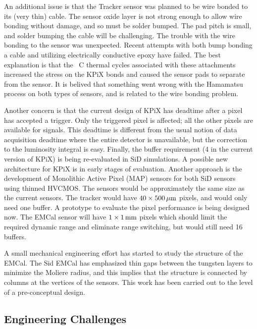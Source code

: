 An additional issue is that the Tracker sensor was planned to be wire bonded to its (very thin) cable. The sensor oxide layer is not strong enough to allow wire bonding without damage, and so must be solder bumped. The pad pitch is small, and solder bumping the cable will be challenging. The trouble with the wire bonding to the sensor was unexpected. Recent attempts with both bump bonding a cable and utilizing electrically conductive epoxy have failed. The best explanation is that the \unit[150]{\textdegree C} thermal cycles associated with these attachments increased the stress on the KPiX bonds and caused the sensor pads to separate from the sensor. It is belived that something went wrong with the Hamamatsu process on both types of sensors, and is related to the wire bonding problem.

Another concern is that the current design of KPiX has deadtime after a pixel has accepted a trigger. Only the triggered pixel is affected; all the other pixels are available for signals. This deadtime is different from the usual notion of data acquisition deadtime where the entire detector is unavailable, but the correction to the luminosity integral is easy. Finally, the buffer requirement (4 in the current version of KPiX) is being re-evaluated in SiD simulations. A possible new architecture for KPiX is in early stages of evaluation. Another approach is the development of Monolithic Active Pixel (MAP) sensors for both SiD sensors using thinned HVCMOS. The sensors would be approximately the same size as the current sensors. The tracker would have $40 \times \unit[500]{\micron}$ pixels, and would only need one buffer. A prototype to evaluate the pixel performance is being designed now. The EMCal sensor will have $1 \times \unit[1]{mm}$ pixels which should limit the required dynamic range and eliminate range switching, but would still need 16 buffers.

A small mechanical engineering effort has started to study the structure of the EMCal. The Sid EMCal has emphasized thin gaps between the tungsten layers to minimize the Moliere radius, and this implies that the structure is connected by columns at the vertices of the sensors. This work has been carried out to the level of a pre-conceptual design.

\subsection{Engineering Challenges}
